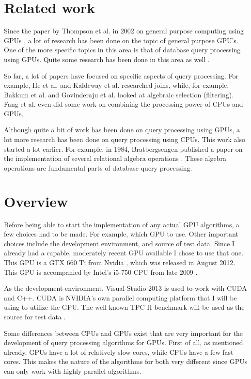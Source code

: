 \documentclass[a4paper,titlepage]{article}
\begin{document}
\section{Related work}
\label{sec:related-work}
Since the paper by Thompson et al. in 2002 on general purpose computing using GPUs \cite{thompson2002}, a lot of research has been done on the topic of general purpose GPU's. One of the more specific topics in this area is that of database query processing using GPUs. Quite some research has been done in this area as well \cite{bakkum2010,fang2007,kaldeway2010}. 

So far, a lot of papers have focused on specific aspects of query processing. For example, He et al. \cite{he2008} and Kaldeway et al. \cite{kaldeway2010} researched joins, while, for example, Bakkum et al. \cite{bakkum2010} and Govinderaju et al. \cite{govindaraju2004} looked at algebraic selection (filtering).  Fang et al. \cite{fang2007} even did some work on combining the processing power of CPUs and GPUs.

Although quite a bit of work has been done on query processing using GPUs, a lot more research has been done on query processing using CPUs. This work also started a lot earlier. For example, in 1984, Bratbergsengen published a paper on the implementation of several relational algebra operations \cite{bratbergsengen1984}. These algebra operations are fundamental parts of database query processing.

\section{Overview}
\label{sec:overview}
Before being able to start the implementation of any actual GPU algorithms, a few choices had to be made. For example, which GPU to use. Other important choices include the development environment, and source of test data. Since I already had a capable, moderately recent GPU available I chose to use that one. This GPU is a GTX 660 Ti from Nvidia \cite{gtx660ti}, which was released in August 2012. This GPU is accompanied by Intel's i5-750 CPU from late 2009 \cite{i5-750}.

As the development environment, Visual Studio 2013 is used to work with CUDA \cite{CUDA} and C++. CUDA is NVIDIA's own parallel computing platform that I will be using to utilize the GPU. The well known TPC-H benchmark will be used as the source for test data \cite{tpc-h}.

Some differences between CPUs and GPUs exist that are very important for the development of query processing algorithms for GPUs. First of all, as mentioned already, GPUs have a lot of relatively slow cores, while CPUs have a few fast cores. This makes the nature of the algorithms for both very different since GPUs can only work with highly parallel algorithms.
\end{document}

